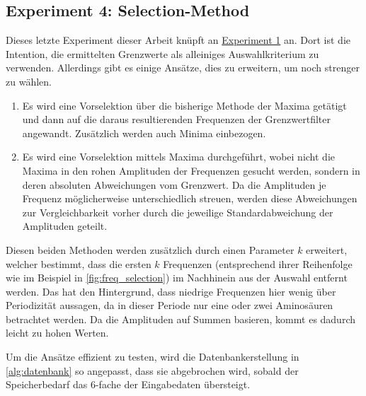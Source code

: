     \subsection{Experiment 4: Selection-Method} %
        \label{exp:selection_method}
        Dieses letzte Experiment dieser Arbeit knüpft an \hyperref[exp:uniref90]{Experiment 1} an. Dort ist die Intention, die ermittelten Grenzwerte als alleiniges Auswahlkriterium zu verwenden. Allerdings gibt es einige Ansätze, dies zu erweitern, um noch strenger zu wählen.
    
    \begin{enumerate}
        \item Es wird eine Vorselektion über die bisherige Methode der Maxima getätigt und dann auf die daraus resultierenden Frequenzen der Grenzwertfilter angewandt. Zusätzlich werden auch Minima einbezogen.
        \item Es wird eine Vorselektion mittels Maxima durchgeführt, wobei nicht die Maxima in den rohen Amplituden der Frequenzen gesucht werden, sondern in deren absoluten Abweichungen vom Grenzwert. Da die Amplituden je Frequenz möglicherweise unterschiedlich streuen, werden diese Abweichungen zur Vergleichbarkeit vorher durch die jeweilige Standardabweichung der Amplituden geteilt.
    \end{enumerate}

    Diesen beiden Methoden werden zusätzlich durch einen Parameter $k$ erweitert, welcher bestimmt, dass die ersten $k$ Frequenzen (entsprechend ihrer Reihenfolge wie im Beispiel in \autoref{fig:freq_selection}) im Nachhinein aus der Auswahl entfernt werden. Das hat den Hintergrund, dass niedrige Frequenzen hier wenig über Periodizität aussagen, da in dieser Periode nur eine oder zwei Aminosäuren betrachtet werden. Da die Amplituden auf Summen basieren, kommt es dadurch leicht zu hohen Werten.

    Um die Ansätze effizient zu testen, wird die Datenbankerstellung in \autoref{alg:datenbank} so angepasst, dass sie abgebrochen wird, sobald der Speicherbedarf das 6-fache der Eingabedaten übersteigt.
